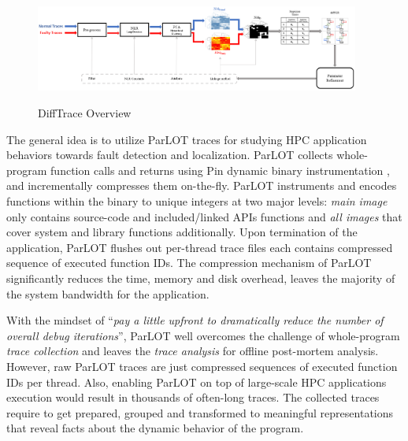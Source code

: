 \begin{figure}[]
\caption{DiffTrace Overview}
\includegraphics[width=0.95\textwidth]{figs/overview.png}
\label{fig.diffTraceOverview}
\end{figure}

The general idea is to utilize ParLOT \cite{ parlot} traces for studying HPC application behaviors towards fault detection and localization.
%
ParLOT collects whole-program function calls and returns using Pin dynamic binary instrumentation \cite{pin}, and incrementally compresses them on-the-fly.
%
ParLOT instruments and encodes functions within the binary to unique integers at two major levels: \textit{main image} only contains source-code and included/linked APIs functions and \textit{all images} that cover system and library functions additionally.
%
Upon termination of the application, ParLOT flushes out per-thread trace files each contains compressed sequence of executed function IDs.
%
The compression mechanism of ParLOT significantly reduces the time, memory and disk overhead, leaves the majority of the system bandwidth for the application. 
%

With the mindset of ``\textit{pay a little upfront to dramatically reduce the number of overall debug iterations}'', ParLOT well overcomes the challenge of whole-program \textit{trace collection} and leaves the \textit{trace analysis} for offline post-mortem analysis. 
%
However, raw ParLOT traces are just compressed sequences of executed function IDs per thread.
%
Also, enabling ParLOT on top of large-scale HPC applications execution would result in thousands of often-long traces.
%
The collected traces require to  get prepared, grouped and transformed to meaningful representations that reveal facts about the dynamic behavior of the program.

